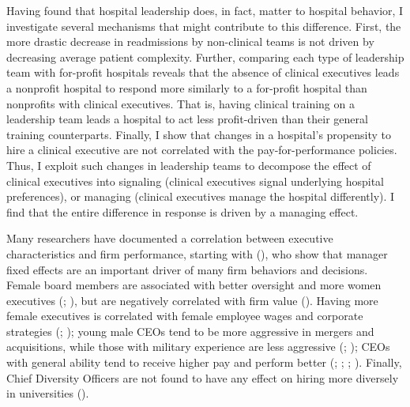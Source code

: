 \documentclass[12pt]{article}
\begin{document}
    Having found that hospital leadership does, in fact, matter to hospital behavior, I investigate several mechanisms that might contribute to this difference. First, the more drastic decrease in readmissions by non-clinical teams is not driven by decreasing average patient complexity. Further, comparing each type of leadership team with for-profit hospitals reveals that the absence of clinical executives leads a nonprofit hospital to respond more similarly to a for-profit hospital than nonprofits with clinical executives. That is, having clinical training on a leadership team leads a hospital to act less profit-driven than their general training counterparts. Finally, I show that changes in a hospital's propensity to hire a clinical executive are not correlated with the pay-for-performance policies. Thus, I exploit such changes in leadership teams to decompose the effect of clinical executives into signaling (clinical executives signal underlying hospital preferences), or managing (clinical executives manage the hospital differently). I find that the entire difference in response is driven by a managing effect. 

    Many researchers have documented a correlation between executive characteristics and firm performance, starting with \citeauthor{bertrand2003managing} (\citeyear{bertrand2003managing}), who show that manager fixed effects are an important driver of many firm behaviors and decisions. Female board members are associated with better oversight and more women executives (\cite{matsa2011chipping}; \cite{adams2009women}), but are negatively correlated with firm value (\cite{ahern2012changing}). Having more female executives is correlated with female employee wages and corporate strategies (\cite{flabbi2019female}; \cite{matsa2013female}); young male CEOs tend to be more aggressive in mergers and acquisitions, while those with military experience are less aggressive (\cite{levi2010deal}; \cite{benmelech2015military}); CEOs with general ability tend to receive higher pay and perform better (\cite{kaplan2012ceo}; \cite{custodio2013generalists}; \cite{adams2018director}; \cite{frydman2019rising}). Finally, Chief Diversity Officers are not found to have any effect on hiring more diversely in universities (\cite{bradley2022impact}). 
    
\end{document}

